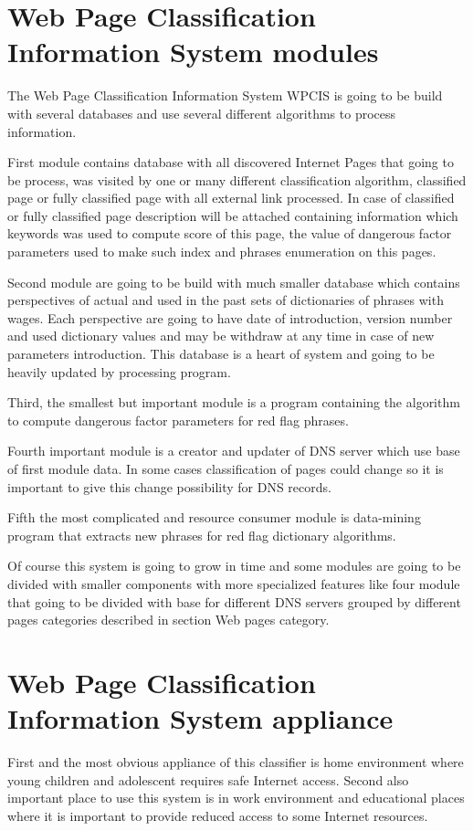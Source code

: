 \documentclass[9pt,a4paper]{extarticle}
\begin{document}
\begin{multicols}{2}
\section{Web Page Classification Information System modules}
The Web Page Classification Information System WPCIS is going to be build with several databases and use several different algorithms to process information.

First module contains database with all discovered Internet Pages that going to be process, was visited by one or many different classification algorithm, classified page or fully classified page with all external link processed. In case of classified or fully classified page description will be attached containing information which keywords was used to compute score of this page, the value of dangerous factor parameters used to make such index and phrases enumeration on this pages.

Second module are going to be build with much smaller database which contains perspectives of actual and used in the past sets of dictionaries of phrases with wages. Each perspective are going to have date of introduction, version number and used dictionary values and may be withdraw at any time in case of new parameters introduction. This database is a heart of system and going to be heavily updated by processing program.

Third, the smallest but important module is a program containing the algorithm to compute dangerous factor parameters for red flag phrases.

Fourth important module is a creator and updater of DNS server which use base of first module data. In some cases classification of pages could change so it is important to give this change possibility for DNS records.

Fifth the most complicated and resource consumer module is data-mining program that extracts new phrases for red flag dictionary algorithms.

Of course this system is going to grow in time and some modules are going to be divided with smaller components with more specialized features like four module that going to be divided with base for different DNS servers grouped by different pages categories described in section Web pages category.

\section{Web Page Classification Information System appliance}
First and the most obvious appliance of this classifier is home environment where young children and adolescent requires safe Internet access. Second also important place to use this system is in work environment and educational places where it is important to provide reduced access to some Internet resources.


\end{multicols}
\end{document}
